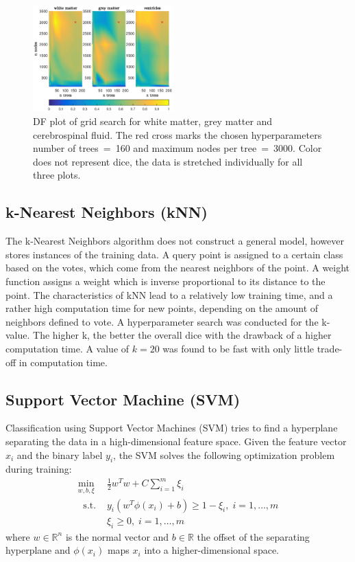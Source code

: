 \documentclass[journal]{IEEEtran}
\begin{document}
\begin{figure}[h!]
	\centering
	\includegraphics[width=0.48\textwidth]{images/df_grid}
	\caption{DF plot of grid search for white matter, grey matter and cerebrospinal fluid. The red cross marks the chosen hyperparameters number of trees~=~160 and maximum nodes per tree~=~3000. Color does not represent dice, the data is stretched individually for all three plots.}\label{f.df_gridsearch}
\end{figure}

\subsection{k-Nearest Neighbors (kNN)}
The k-Nearest Neighbors algorithm does not construct a general model, however stores instances of the training data. A query point is assigned to a certain class based on the votes, which come from the nearest neighbors of the point. A weight function assigns a weight which is inverse proportional to its distance to the point. The characteristics of kNN lead to a relatively low training time, and a rather high computation time for new points, depending on the amount of neighbors defined to vote. A hyperparameter search was conducted for the k-value. The higher k, the better the overall dice with the drawback of a higher computation time. A value of $k=20$ was found to be fast with only little trade-off in computation time.

\subsection{Support Vector Machine (SVM)}
Classification using Support Vector Machines (SVM) tries to find a hyperplane separating the data in a high-dimensional feature space. Given the feature vector $x_i$ and the binary label $y_i$, the SVM solves the following optimization problem during training:
\begin{equation}
\begin{split}
\min_{w, b, \xi} \ & \frac{1}{2}w^Tw + C\sum_{i=1}^m \xi_i \\
\ \text{ s.t. } & y_i(w^T\phi(x_i)+b) \geq 1-\xi_i, \; i = 1, \ldots, m \\
& \xi_i \geq 0, \; i = 1, \ldots, m
\end{split}
\end{equation}
where $w\in \mathbb{R}^n $ is the normal vector and $b \in \mathbb{R}$ the offset of the separating hyperplane and $\phi(x_i)$ maps $x_i$ into a higher-dimensional space.
\end{document}
